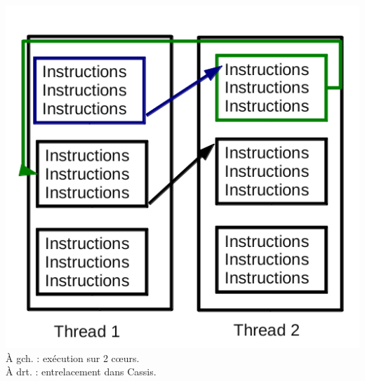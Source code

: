 \begin{frame}
\begin{columns}[T]
\begin{column}{.5\textwidth}
     \includegraphics[scale=0.35]{images/schema_lua.png}\\
     \`A gch. : exécution sur 2 c\oe urs.\\
     \`A drt. : entrelacement dans Cassis.
   \end{column}
 \end{columns}
 
\end{frame}

